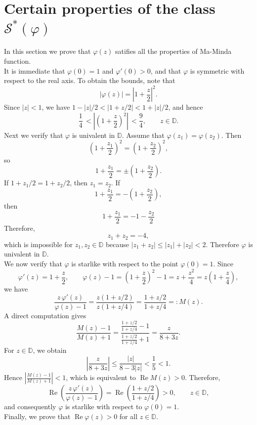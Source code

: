 \documentclass[a4paper,12pt,reqno]{amsart} %
\numberwithin{equation}{section}
\theoremstyle{definition}
\begin{document}
\section{Certain properties of the class $\mathcal{S}^*(\varphi)$}
In this section we prove that $\varphi(z)$ satifies all the properties of Ma-Minda function.\\
It is immediate that $\varphi(0)=1$ and $\varphi'(0)>0$, and that $\varphi$ is symmetric with respect to the real axis.
To obtain the bounds, note that
\[
\left|\varphi(z)\right|=\left|1+\frac{z}{2}\right|^{2}.
\]
Since $|z|<1$, we have $1-{|z|}/{2}<\left|1+{z}/{2}\right|<1+{|z|}/{2}$, and hence
\begin{equation}\label{eq:2.1}
\frac{1}{4} \,< \left|\left(1+\frac{z}{2}\right)^{2}\right| \,< \frac{9}{4},
\qquad  z \in \mathbb{D}.
\end{equation}
Next we verify that $\varphi$ is univalent in $\mathbb{D}$. Assume that $\varphi(z_1)=\varphi(z_2)$. Then
\[
\left(1 + \frac{z_1}{2} \right)^2 = \left(1 + \frac{z_2}{2} \right)^2,
\]
so
\[
1 + \frac{z_1}{2} = \pm \left(1 + \frac{z_2}{2} \right).
\]
If $1 + {z_1}/{2} = 1 + {z_2}/{2}$, then $z_1=z_2$. If
\[
1 + \frac{z_1}{2} = -\left(1 + \frac{z_2}{2} \right),
\]
then
\[
1+\frac{z_1}{2}=-1-\frac{z_2}{2}
\]
Therefore, 
\[
z_1+z_2=-4,
\]
which is impossible for $z_1,z_2\in\mathbb{D}$ because $|z_1+z_2|\le |z_1|+|z_2|<2$.
Therefore $\varphi$ is univalent in $\mathbb{D}$.\\[2mm]
We now verify that $\varphi$ is starlike with respect to the point $\varphi(0)=1$. Since
\begin{equation}\label{eq:2.2}
\varphi'(z)=1+\frac{z}{2},
\qquad
\varphi(z)-1=\left(1+\frac{z}{2}\right)^2-1=z+\frac{z^2}{4}=z\left(1+\frac{z}{4}\right),
\end{equation}
we have
\[
\frac{z\,\varphi'(z)}{\varphi(z)-1}
=
\frac{z(1+z/2)}{z(1+z/4)}
=
\frac{1+z/2}{1+z/4}
=:M(z).
\]
A direct computation gives
\[
\frac{M(z)-1}{M(z)+1}
=
\frac{\frac{1+z/2}{1+z/4}-1}{\frac{1+z/2}{1+z/4}+1}
=
\frac{z}{8+3z}.
\]
For $z\in\mathbb{D}$, we obtain
\[
\left|\frac{z}{8+3z}\right|
\le \frac{|z|}{8-3|z|}
<\frac{1}{5}<1.
\]
Hence $\left|\frac{M(z)-1}{M(z)+1}\right|<1$, which is equivalent to $\operatorname{Re} M(z)>0$. Therefore,
\[
\operatorname{Re}\!\left(\frac{z\,\varphi'(z)}{\varphi(z)-1}\right)
=
\operatorname{Re}\!\left(\frac{1+z/2}{1+z/4}\right)>0,
\qquad z\in\mathbb{D},
\]
and consequently $\varphi$ is starlike with respect to $\varphi(0)=1$.\\[2mm]
Finally, we prove  that $\operatorname{Re}\varphi(z)>0$ for all $z\in\mathbb{D}$.
\end{document}
